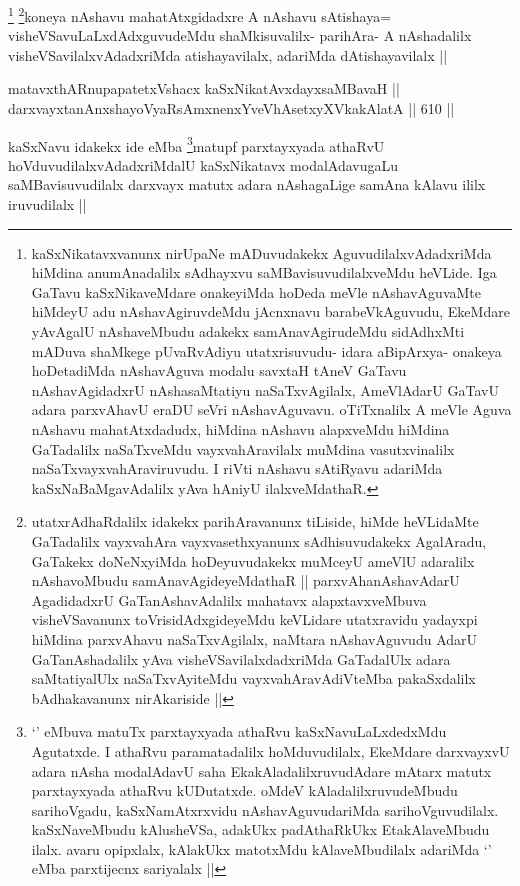 \begin{artha}
\footnote{kaSxNikatavxvanunx nirUpaNe mADuvudakekx AguvudilalxvAdadxriMda hiMdina anumAnadalilx sAdhayxvu saMBavisuvudilalxveMdu heVLide. Iga GaTavu kaSxNikaveMdare onakeyiMda hoDeda meVle nAshavAguvaMte hiMdeyU adu nAshavAgiruvdeMdu jAcnxnavu barabeVkAguvudu, EkeMdare yAvAgalU nAshaveMbudu adakekx samAnavAgirudeMdu sidAdhxMti mADuva shaMkege pUvaRvAdiyu utatxrisuvudu- idara aBipArxya- onakeya hoDetadiMda nAshavAguva modalu savxtaH tAneV GaTavu nAshavAgidadxrU nAshasaMtatiyu naSaTxvAgilalx, AmeVlAdarU GaTavU adara parxvAhavU eraDU seVri nAshavAguvavu. oTiTxnalilx A meVle Aguva nAshavu mahatAtxdadudx, hiMdina nAshavu alapxveMdu hiMdina GaTadalilx naSaTxveMdu vayxvahAravilalx muMdina vasutxvinalilx naSaTxvayxvahAraviruvudu. I riVti nAshavu sAtiRyavu adariMda kaSxNaBaMgavAdalilx yAva hAniyU ilalxveMdathaR.}
\footnote{utatxrAdhaRdalilx idakekx parihAravanunx tiLiside, hiMde heVLidaMte GaTadalilx vayxvahAra vayxvasethxyanunx sAdhisuvudakekx AgalAradu, GaTakekx doNeNxyiMda hoDeyuvudakekx muMceyU ameVlU adaralilx nAshavoMbudu samAnavAgideyeMdathaR || parxvAhanAshavAdarU AgadidadxrU GaTanAshavAdalilx mahatavx alapxtavxveMbuva visheVSavanunx toVrisidAdxgideyeMdu keVLidare utatxravidu yadayxpi hiMdina parxvAhavu naSaTxvAgilalx, naMtara nAshavAguvudu AdarU GaTanAshadalilx yAva visheVSavilalxdadxriMda GaTadalUlx adara saMtatiyalUlx naSaTxvAyiteMdu vayxvahAravAdiVteMba pakaSxdalilx bAdhakavanunx nirAkariside ||}koneya nAshavu mahatAtxgidadxre A nAshavu sAtishaya= visheVSavuLaLxdAdxguvudeMdu shaMkisuvalilx- parihAra- A nAshadalilx visheVSavilalxvAdadxriMda atishayavilalx, adariMda dAtishayavilalx ||
\end{artha}


\begin{shl}
matavxthARnupapatetxVshacx kaSxNikatAvxdayxsaMBavaH || \\
darxvayxtanAnxshayoVyaRsAmxnenxYveVhAsetxyXVkakAlatA ||  610 ||  
\end{shl}

\begin{artha}
kaSxNavu idakekx ide eMba \footnote{`\stext' eMbuva matuTx parxtayxyada athaRvu kaSxNavuLaLxdedxMdu Agutatxde. I athaRvu paramatadalilx hoMduvudilalx, EkeMdare darxvayxvU adara nAsha modalAdavU saha EkakAladalilxruvudAdare mAtarx matutx parxtayxyada athaRvu kUDutatxde. oMdeV kAladalilxruvudeMbudu sarihoVgadu, kaSxNamAtxrxvidu nAshavAguvudariMda sarihoVguvudilalx. kaSxNaveMbudu kAlusheVSa, adakUkx padAthaRkUkx EtakAlaveMbudu ilalx. avaru opipxlalx, kAlakUkx matotxMdu kAlaveMbudilalx adariMda `\stext' eMba parxtijecnx sariyalalx ||}matupf parxtayxyada athaRvU hoVduvudilalxvAdadxriMdalU kaSxNikatavx modalAdavugaLu saMBavisuvudilalx darxvayx matutx adara nAshagaLige samAna kAlavu ililx iruvudilalx ||
\end{artha}

